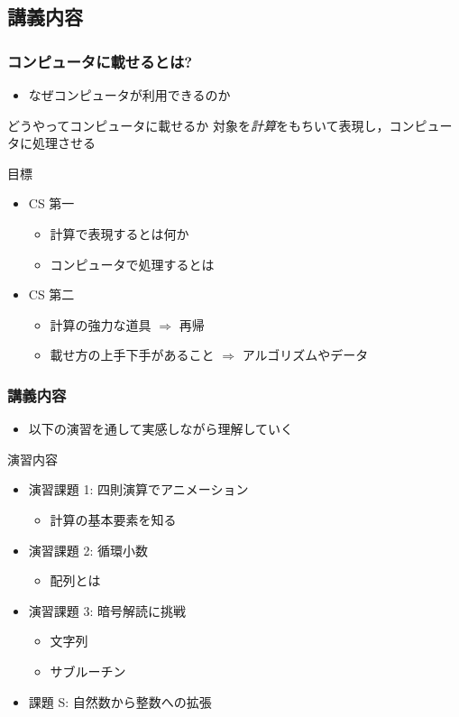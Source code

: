\subsection{講義内容}
\begin{frame}
\frametitle{コンピュータに載せるとは?}
  \begin{itemize}
\item なぜコンピュータが利用できるのか
  \end{itemize}
  \begin{block}{どうやってコンピュータに載せるか}
対象を\emph{計算}をもちいて表現し，コンピュータに処理させる
  \end{block}
  \begin{block}{目標}
    \begin{itemize}
\item CS 第一
      \begin{itemize}
\item 計算で表現するとは何か
\item コンピュータで処理するとは
      \end{itemize}
\item CS 第二 \href{https://wakita.github.io/classes/y21/cs2/course.html}{}
      \begin{itemize}
\item 計算の強力な道具 $\Rightarrow$ 再帰
\item 載せ方の上手下手があること $\Rightarrow$ アルゴリズムやデータ
      \end{itemize}
    \end{itemize}
  \end{block}
\end{frame}
\begin{frame}
\frametitle{講義内容}
  \begin{itemize}
\item 以下の演習を通して実感しながら理解していく
  \end{itemize}
  \begin{block}{演習内容}
    \begin{itemize}
\item 演習課題 1: 四則演算でアニメーション
      \begin{itemize}
\item 計算の基本要素を知る
      \end{itemize}
\item 演習課題 2: 循環小数
      \begin{itemize}
\item 配列とは
      \end{itemize}
\item 演習課題 3: 暗号解読に挑戦
      \begin{itemize}
\item 文字列
\item サブルーチン
      \end{itemize}
\item 課題 S: 自然数から整数への拡張
    \end{itemize}
  \end{block}
\end{frame}

